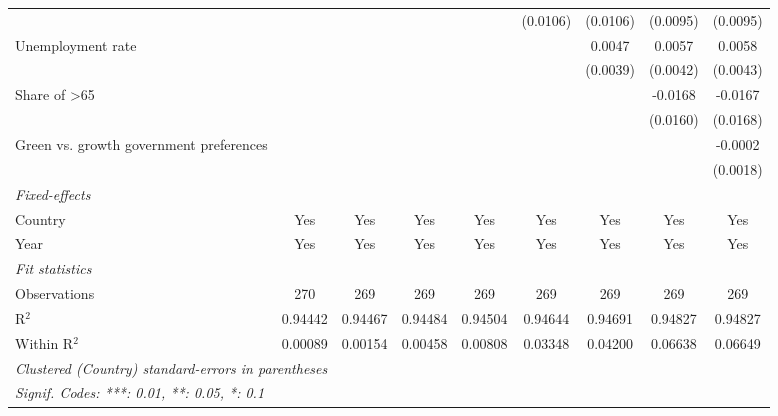 \begin{table}[htbp]
\begin{tabular}{lcccccccc}
                                                                    &          &          &                       &                        & (0.0106) & (0.0106) & (0.0095) & (0.0095)\\   
      Unemployment rate                                             &          &          &                       &                        &          & 0.0047   & 0.0057   & 0.0058\\   
                                                                    &          &          &                       &                        &          & (0.0039) & (0.0042) & (0.0043)\\   
      Share of >65                                                  &          &          &                       &                        &          &          & -0.0168  & -0.0167\\   
                                                                    &          &          &                       &                        &          &          & (0.0160) & (0.0168)\\   
      Green vs. growth government preferences                       &          &          &                       &                        &          &          &          & -0.0002\\   
                                                                    &          &          &                       &                        &          &          &          & (0.0018)\\   
      \midrule
      \emph{Fixed-effects}\\
      Country                                                       & Yes      & Yes      & Yes                   & Yes                    & Yes      & Yes      & Yes      & Yes\\  
      Year                                                          & Yes      & Yes      & Yes                   & Yes                    & Yes      & Yes      & Yes      & Yes\\  
      \midrule
      \emph{Fit statistics}\\
      Observations                                                  & 270      & 269      & 269                   & 269                    & 269      & 269      & 269      & 269\\  
      R$^2$                                                         & 0.94442  & 0.94467  & 0.94484               & 0.94504                & 0.94644  & 0.94691  & 0.94827  & 0.94827\\  
      Within R$^2$                                                  & 0.00089  & 0.00154  & 0.00458               & 0.00808                & 0.03348  & 0.04200  & 0.06638  & 0.06649\\  
      \midrule \midrule
      \multicolumn{9}{l}{\emph{Clustered (Country) standard-errors in parentheses}}\\
      \multicolumn{9}{l}{\emph{Signif. Codes: ***: 0.01, **: 0.05, *: 0.1}}\\
   \end{tabular}
\end{table}


